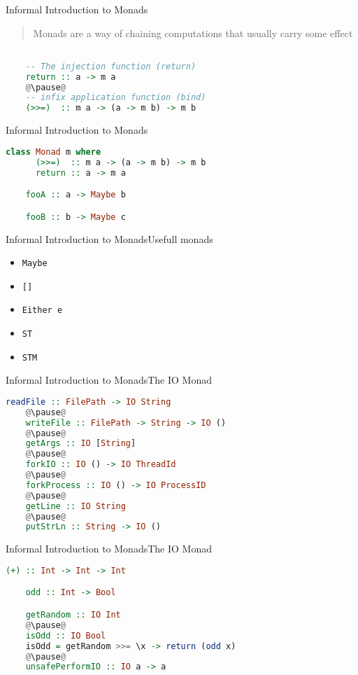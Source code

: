 \documentclass[rail]{beamer}
\begin{document}
\begin{frame}[fragile]{Informal Introduction to Monads}
  \pause
  \begin{quote}
    Monads are a way of chaining computations that usually carry some
    effect
  \end{quote}
  \pause
  \begin{lstlisting}[language=Haskell]

    -- The injection function (return)
    return :: a -> m a
    @\pause@
    -- infix application function (bind)
    (>>=)  :: m a -> (a -> m b) -> m b

  \end{lstlisting}


\end{frame}

\begin{frame}[fragile]{Informal Introduction to Monads}
  \begin{lstlisting}[language=Haskell]
    class Monad m where
      (>>=)  :: m a -> (a -> m b) -> m b
      return :: a -> m a

    fooA :: a -> Maybe b

    fooB :: b -> Maybe c
  \end{lstlisting}
\end{frame}

\begin{frame}{Informal Introduction to Monads}{Usefull monads}
  \pause
  \begin{itemize}[<+->]
  \item \texttt{Maybe}
  \item \texttt{[]}
  \item \texttt{Either e}
  \item \texttt{ST}
  \item \texttt{STM}
  \end{itemize}
\end{frame}

\begin{frame}[fragile]{Informal Introduction to Monads}{The IO Monad}
  \begin{lstlisting}[language=Haskell]
    readFile :: FilePath -> IO String
    @\pause@
    writeFile :: FilePath -> String -> IO ()
    @\pause@
    getArgs :: IO [String]
    @\pause@
    forkIO :: IO () -> IO ThreadId
    @\pause@
    forkProcess :: IO () -> IO ProcessID
    @\pause@
    getLine :: IO String
    @\pause@
    putStrLn :: String -> IO ()
  \end{lstlisting}
\end{frame}

\begin{frame}[fragile]{Informal Introduction to Monads}{The IO Monad}
  \begin{lstlisting}[language=Haskell]
    (+) :: Int -> Int -> Int

    odd :: Int -> Bool

    getRandom :: IO Int
    @\pause@
    isOdd :: IO Bool
    isOdd = getRandom >>= \x -> return (odd x)
    @\pause@
    unsafePerformIO :: IO a -> a
  \end{lstlisting}
\end{frame}
\end{document}
